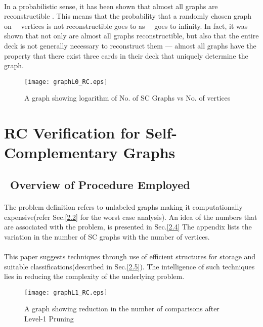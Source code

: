 \documentclass[12pt,conference]{IEEEtran}
\begin{document}
\paragraph*{} In a probabilistic sense, it has been shown that almost all graphs are reconstructible \cite{b2}. This means that the probability that a randomly chosen graph on    vertices is not reconstructible goes to  as    goes to infinity. In fact, it was shown that not only are almost all graphs reconstructible, but also that the entire deck is not generally necessary to reconstruct them — almost all graphs have the property that there exist three cards in their deck that uniquely determine the graph. 


\begin{figure*}
	  \centering 
           \texttt{[image: graphL0\_RC.eps]}
	   \caption{A graph showing logarithm of No. of SC Graphs vs No. of vertices}
	   \label{plot}
  \end{figure*} 



\section{ RC Verification for Self-Complementary Graphs}



\subsection{\label{2.1} Overview of Procedure Employed }
\paragraph*{} The problem definition refers to unlabeled graphs making it computationally expensive(refer Sec.\ref{2.2} for the worst case analysis). An idea of the numbers that are associated with the problem, is presented in Sec.\ref{2.4} The appendix lists the variation in the number of SC graphs with the number of vertices. 
\paragraph*{} This paper suggests techniques through use of efficient structures for storage and suitable classifications(described in Sec.\ref{2.5}). The intelligence of such techniques lies in reducing the complexity of the underlying problem.

\begin{figure*}
	  \centering 
           \texttt{[image: graphL1\_RC.eps]}
	   \caption{A graph showing reduction in the number of comparisons after Level-1 Pruning}
	   \label{prune}
  \end{figure*} 
\end{document}
